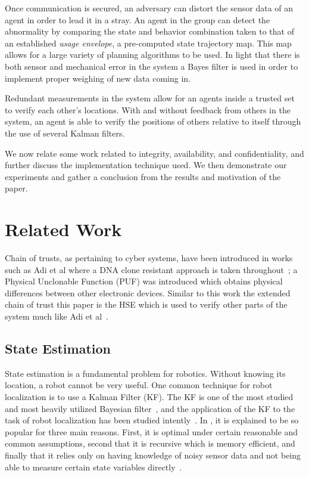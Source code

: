 \documentclass[conference]{IEEEtran}
\begin{document}
Once communication is secured, an adversary can distort the sensor data of an agent in order to lead it in a stray. An agent in the group can detect the abnormality by comparing the state and behavior combination taken to that of an established \textit{usage envelope}, a pre-computed state trajectory map. This map allows for a large variety of planning algorithms to be used. In light that there is both sensor and mechanical error in the system a Bayes filter is used in order to implement proper weighing of new data coming in.

Redundant measurements in the system allow for an agents inside a trusted set to verify each other's locations. With and without feedback from others in the system, an agent is able to verify the positions of others relative to itself through the use of several Kalman filters.

We now relate some work related to integrity, availability, and confidentiality, and further discuss the implementation technique used. We then demonstrate our experiments and gather a conclusion from the results and motivation of the paper.

\section{Related Work}
Chain of trusts, as pertaining to cyber systems, have been introduced in works such as Adi et al where a DNA clone resistant approach is taken throughout~\cite{adi2009mechatronic}; a Physical Unclonable Function (PUF) was introduced which obtains physical differences between other electronic devices. Similar to this work the extended chain of trust this paper is the HSE which is used to verify other parts of the system much like Adi et al~\cite{adi2009mechatronic}.

\subsection{State Estimation}
State estimation is a fundamental problem for robotics. Without knowing its location, a robot cannot be very useful. One common technique for robot localization is to use a Kalman Filter (KF). The KF is one of the most studied and most heavily utilized Bayesian filter~\cite[39-81]{ProbabilisticRobotics}, and the application of the KF to the task of robot localization has been studied intently~\cite{Localization2003, Mohsin2014}. In \textcite{Mohsin2014}, it is explained to be so popular for three main reasons. First, it is optimal under certain reasonable and common assumptions, second that it is recursive which is memory efficient, and finally that it relies only on having knowledge of noisy sensor data and not being able to measure certain state variables directly~\cite{Mohsin2014}.
\end{document}
